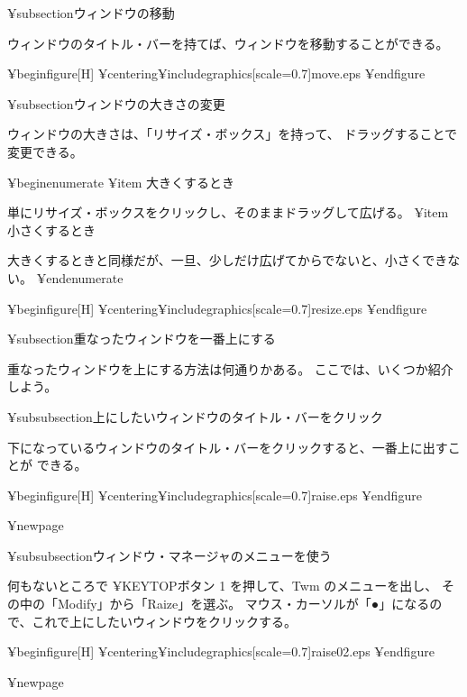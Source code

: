 
¥subsection{ウィンドウの移動}

ウィンドウのタイトル・バーを持てば、ウィンドウを移動することができる。

¥begin{figure}[H]
¥centering{¥includegraphics[scale=0.7]{move.eps}}
¥end{figure}

¥subsection{ウィンドウの大きさの変更}

ウィンドウの大きさは、「リサイズ・ボックス」を持って、
ドラッグすることで変更できる。

¥begin{enumerate}
¥item 大きくするとき

単にリサイズ・ボックスをクリックし、そのままドラッグして広げる。
¥item 小さくするとき

大きくするときと同様だが、一旦、少しだけ広げてからでないと、小さくできない。
¥end{enumerate}

¥begin{figure}[H]
¥centering{¥includegraphics[scale=0.7]{resize.eps}}
¥end{figure}


¥subsection{重なったウィンドウを一番上にする}

重なったウィンドウを上にする方法は何通りかある。
ここでは、いくつか紹介しよう。

¥subsubsection{上にしたいウィンドウのタイトル・バーをクリック}

下になっているウィンドウのタイトル・バーをクリックすると、一番上に出すことが
できる。

¥begin{figure}[H]
¥centering{¥includegraphics[scale=0.7]{raise.eps}}
¥end{figure}

¥newpage

¥subsubsection{ウィンドウ・マネージャのメニューを使う}

何もないところで ¥KEYTOP{ボタン 1} を押して、Twm のメニューを出し、
その中の「Modify」から「Raize」を選ぶ。
マウス・カーソルが「●」になるので、これで上にしたいウィンドウをクリックする。

¥begin{figure}[H]
¥centering{¥includegraphics[scale=0.7]{raise02.eps}}
¥end{figure}

¥newpage
{~}
